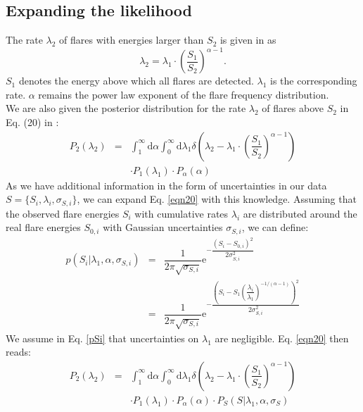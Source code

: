 \documentclass{aa}
\begin{document}
\begin{appendix}
\section{Expanding the likelihood}
The rate $\lambda_2$ of flares with energies larger than $S_2$ is given in \citet{wheatland_flaresbayes_2004} as
\begin{equation}
\label{eqn4}
    \lambda_2 = \lambda_1 \cdot \left(\dfrac{S_1}{S_2}\right)^{\alpha-1}.
\end{equation}
$S_1$ denotes the energy above which all flares are detected. $\lambda_1$ is the corresponding rate. $\alpha$ remains the power law exponent of the flare frequency distribution.
\\
We are also given the posterior distribution for the rate $\lambda_2$ of flares above $S_2$ in Eq. (20) in \citet{wheatland_flaresbayes_2004}:
\begin{eqnarray}
\label{eqn20}
P_2(\lambda_2) &=& \displaystyle \int_{1}^{\infty} \mathrm{d}\alpha \int_{0}^{\infty} \mathrm{d}\lambda_1 \delta\left(\lambda_2 - \lambda_1 \cdot \left( \dfrac{S_1}{S_2} \right)^{\alpha-1}\right)\nonumber \\
&&\cdot P_1(\lambda_1) \cdot P_{\alpha}(\alpha)
\end{eqnarray}
As we have additional information in the form of uncertainties in our data $S=\{S_i,\lambda_i,\sigma_{S,i}\}$, we can expand Eq. \ref{eqn20} with this knowledge. Assuming that the observed flare energies $S_i$ with cumulative rates $\lambda_i$ are distributed around the real flare energies $S_{0,i}$ with Gaussian uncertainties $\sigma_{S,i}$, we can define:
\begin{eqnarray}
    \label{pSi}
    p(S_i | \lambda_1, \alpha, \sigma_{S,i})
    &=& \dfrac{1}{2\pi \sqrt{\sigma_{S,i}}} \mathrm{e}^{-\dfrac{\left(S_i - S_{0,i}\right)^2}{2\sigma_{S,i}^2}}\nonumber\\
    &=& \dfrac{1}{2\pi \sqrt{\sigma_{S,i}}} \mathrm{e}^{-\dfrac{\left(S_i - S_1\left(\dfrac{\lambda_i}{\lambda_1}\right)^{-1/(\alpha-1)}\right)^2}{2\sigma_{S,i}^2}}
\end{eqnarray}
We assume in Eq. \ref{pSi} that uncertainties on $\lambda_1$ are negligible. Eq. \ref{eqn20} then reads:
\begin{eqnarray}
\label{eqn201}
P_2(\lambda_2) &=& \displaystyle \int_{1}^{\infty} \mathrm{d}\alpha \int_{0}^{\infty} \mathrm{d}\lambda_1 \delta\left(\lambda_2 - \lambda_1 \cdot \left( \dfrac{S_1}{S_2} \right)^{\alpha-1}\right)\nonumber \\
&&\cdot P_1(\lambda_1) \cdot P_{\alpha}(\alpha) \cdot P_S(S| \lambda_1, \alpha, \sigma_S)

\end{eqnarray}
\end{appendix}
\end{document}
